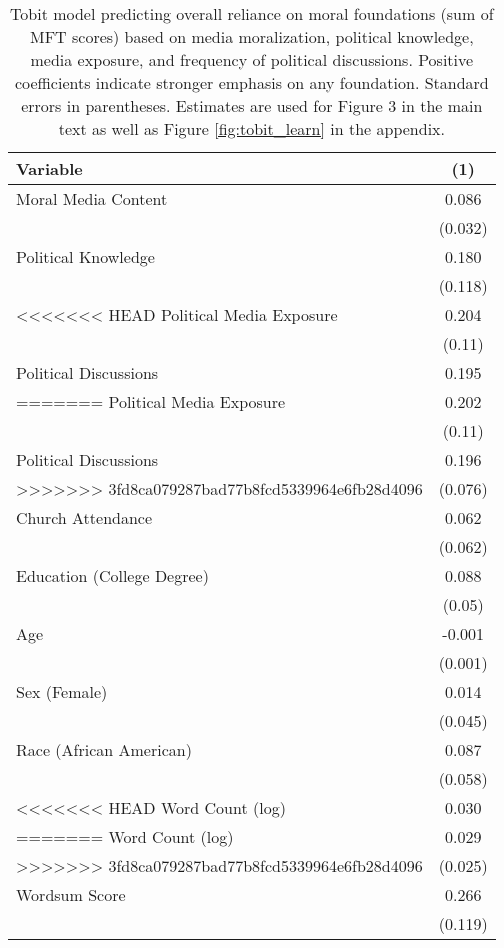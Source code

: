 \begin{table}[ht]
\centering
\caption{Tobit model predicting overall reliance on moral foundations
           (sum of MFT scores) based on media moralization, political knowledge, media exposure, and frequency of 
           political discussions. Positive coefficients indicate stronger emphasis on any foundation.
           Standard errors in parentheses. Estimates are used for Figure 3 in 
           the main text as well as Figure \ref{fig:tobit_learn} in the appendix.} 
\label{tab:tobit_learn}
\begingroup\footnotesize
\begin{tabular}{lc}
  \hline
Variable & (1) \\ 
  \hline
Moral Media Content &  0.086 \\ 
   & (0.032) \\ 
  Political Knowledge &  0.180 \\ 
   & (0.118) \\ 
<<<<<<< HEAD
  Political Media Exposure &  0.204 \\ 
   & (0.11) \\ 
  Political
Discussions &  0.195 \\ 
=======
  Political Media Exposure &  0.202 \\ 
   & (0.11) \\ 
  Political
Discussions &  0.196 \\ 
>>>>>>> 3fd8ca079287bad77b8fcd5339964e6fb28d4096
   & (0.076) \\ 
  Church Attendance &  0.062 \\ 
   & (0.062) \\ 
  Education (College Degree) &  0.088 \\ 
   & (0.05) \\ 
  Age & -0.001 \\ 
   & (0.001) \\ 
  Sex (Female) &  0.014 \\ 
   & (0.045) \\ 
  Race (African American) &  0.087 \\ 
   & (0.058) \\ 
<<<<<<< HEAD
  Word Count (log) &  0.030 \\ 
=======
  Word Count (log) &  0.029 \\ 
>>>>>>> 3fd8ca079287bad77b8fcd5339964e6fb28d4096
   & (0.025) \\ 
  Wordsum Score &  0.266 \\ 
   & (0.119) \\ 

\end{tabular}
\end{table}

